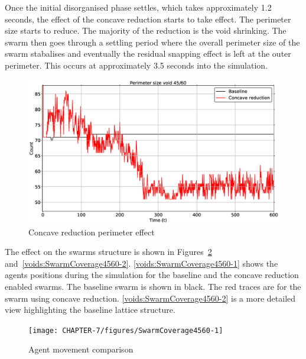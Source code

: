 Once the initial disorganised phase settles, which takes approximately 1.2 seconds, the effect of the concave reduction starts to take effect. The perimeter size starts to reduce. The majority of the reduction is the void shrinking. The swarm then goes through a settling period where the overall perimeter size of the swarm stabalises and eventually the residual snapping effect is left at the outer perimeter. This occurs at approximately 3.5 seconds into the simulation. 
\begin{figure}[H]
\begin{center}
\includegraphics[width=15cm]{CHAPTER-7/figures/ConcavePerimeter4560-1}
\end{center}
\caption{Concave reduction perimeter effect\label{methods:ConcavePerimeter4560-1}}
\end{figure}

The effect on the swarms structure is shown in Figures~\ref{voids:SwarmCoverage4560-1} and~\ref{voids:SwarmCoverage4560-2}. \autoref{voids:SwarmCoverage4560-1} shows the agents positions during the simulation for the baseline and the concave reduction enabled swarms. The baseline swarm is shown in black. The red traces are for the swarm using concave reduction. \autoref{voids:SwarmCoverage4560-2} is a more detailed view highlighting the baseline lattice structure.
\begin{figure}[H]
\begin{center}
\texttt{[image: CHAPTER-7/figures/SwarmCoverage4560-1]}
\end{center}
\caption{Agent movement comparison\label{voids:SwarmCoverage4560-1}}
\end{figure}

